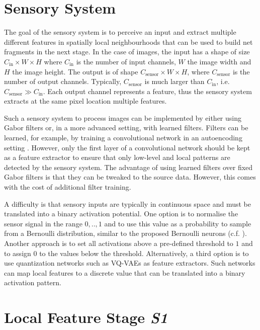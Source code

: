 \section{Sensory System}
The goal of the sensory system is to perceive an input and extract multiple different features in spatially local neighbourhoods that can be used to build net fragments in the next stage.
In the case of images, the input has a shape of size $C_{\text{in}} \times W \times H$ where $C_{\text{in}}$ is the number of input channels, $W$ the image width and $H$ the image height.
The output is of shape $C_{\text{sensor}} \times W \times H$, where $C_{\text{sensor}}$ is the number of output channels. Typically, $C_{\text{sensor}}$ is much larger than $C_{\text{in}}$, i.e. $C_{\text{sensor}} \gg C_{\text{in}}$.
Each output channel represents a feature, thus the sensory system extracts at the same pixel location multiple features.

Such a sensory system to process images can be implemented by either using Gabor filters  or, in a more advanced setting, with learned filters.
Filters can be learned, for example, by training a convolutional network in an autoencoding setting . However, only the first layer of a convolutional network should be kept as a feature extractor to ensure that only low-level and local patterns are detected by the sensory system. The advantage of using learned filters over fixed Gabor filters is that they can be tweaked to the source data. However, this comes with the cost of additional filter training.

A difficulty is that sensory inputs are typically in continuous space and must be translated into a binary activation potential.
One option is to normalise the sensor signal in the range $0, .., 1$ and to use this value as a probability to sample from a Bernoulli distribution, similar to the proposed Bernoulli neurons (c.f. ).
Another approach is to set all activations above a pre-defined threshold to $1$ and to assign 0 to the values below the threshold.
Alternatively, a third option is to use quantization networks such as VQ-VAEs  as feature extractors. Such networks can map local features to a discrete value that can be translated into a binary activation pattern.



\section{Local Feature Stage \emph{S1}}


